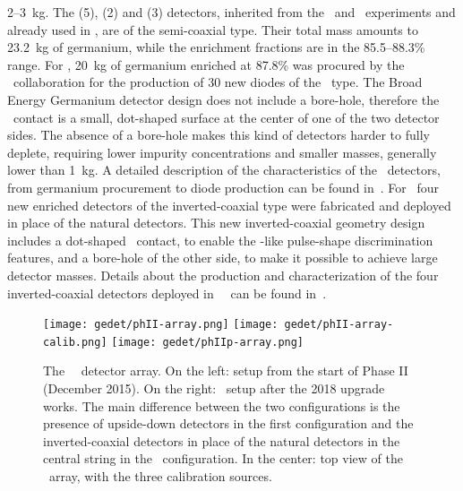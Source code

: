 2--3~kg. The \ANG{} (5), \RG{} (2) and \GTF{} (3) detectors, inherited from the \hdm\ and
\igex\ experiments and already used in \phaseone, are of the semi-coaxial type. Their
total mass amounts to 23.2~kg of germanium, while the enrichment fractions are in the
85.5--88.3\% range. For \phasetwo, 20~kg of germanium enriched at 87.8\% was procured by
the \gerda\ collaboration for the production of 30 new diodes of the \bege\ type. The
Broad Energy Germanium detector design does not include a bore-hole, therefore the \pplus\
contact is a small, dot-shaped surface at the center of one of the two detector sides. The
absence of a bore-hole makes this kind of detectors harder to fully deplete, requiring
lower impurity concentrations and smaller masses, generally lower than 1~kg. A detailed
description of the characteristics of the \bege\ detectors, from germanium procurement to
diode production can be found in~\cite{Agostini2015e, Agostini2018a, Agostini2019}. For
\phasetwop\ four new enriched \IC{} detectors of the inverted-coaxial type were fabricated
and deployed in place of the natural \GTF{} detectors. This new inverted-coaxial geometry
design includes a dot-shaped \pplus\ contact, to enable the \bege-like pulse-shape
discrimination features, and a bore-hole of the other side, to make it possible to achieve
large detector masses. Details about the production and characterization of the  four
inverted-coaxial detectors deployed in \gerda\ \phasetwop\ can be found
in~\cite{inverted-paper}.

\begin{figure}
  \centering
  \texttt{[image: gedet/phII-array.png]}
  \hspace{0.5cm}
  \texttt{[image: gedet/phII-array-calib.png]}
  \hspace{0.5cm}
  \texttt{[image: gedet/phIIp-array.png]}
  \caption{%
    The \gerda\ \phasetwo\ detector array. On the left: setup from the start of Phase II
    (December 2015). On the right: \phasetwop\ setup after the 2018 upgrade works. The
    main difference between the two configurations is the presence of upside-down detectors
    in the first configuration and the inverted-coaxial detectors in place of the natural
    detectors in the central string in the \phasetwop\ configuration. In the center: top
    view of the \phasetwo\ array, with the three calibration sources. \fillme{different
    colors for detector types}
  }\label{fig:setup:array}
\end{figure}

